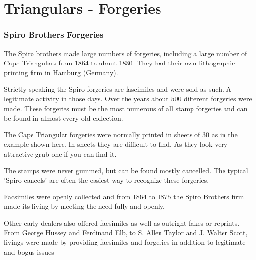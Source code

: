 \chapter{Triangulars - Forgeries}

\subsection{Spiro Brothers Forgeries} 

The Spiro brothers made large numbers of forgeries, including a large 
number of Cape Triangulars from 1864 to about 1880. They had their 
own lithographic printing firm in Hamburg (Germany).


Strictly speaking the Spiro forgeries are fascimiles and were sold 
as such. A legitimate activity in those days. Over the years about 
500 different forgeries were made. These forgeries must be the most 
numerous of all stamp forgeries and can be found in almost every old 
collection.

The Cape Triangular forgeries were normally printed in sheets of 30 
as in the example shown here. In sheets they are difficult to find. 
As they look very attractive grub one if you can find it.

The stamps were never gummed, but can be found mostly cancelled. 
The typical 'Spiro cancels' are often the easiest way to recognize these forgeries.

Facsimiles were openly collected and from 1864 to 1875 the Spiro Brothers firm made
its living by meeting the need fully and openly.

Other early dealers also offered facsimiles as well as outright fakes or reprints.  
From George Hussey and Ferdinand Elb, to S. Allen Taylor and J. Walter Scott, 
livings were made by providing facsimiles and forgeries in addition to 
legitimate and bogus issues

                         